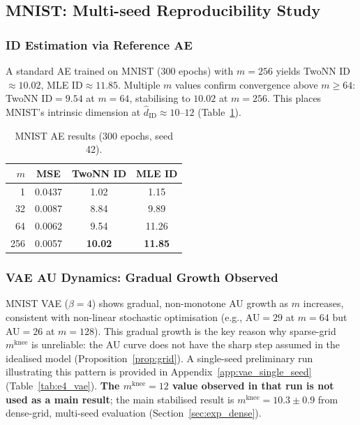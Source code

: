 \documentclass[11pt,a4paper]{article}
\newcommand{\mknee}{m^{\mathrm{knee}}}
\newcommand{\hatdID}{\hat{d}_{\mathrm{ID}}}
\begin{document}
\subsection{MNIST: Multi-seed Reproducibility Study}\label{sec:exp_mnist}

\subsubsection{ID Estimation via Reference AE}

A standard AE trained on MNIST (300 epochs) with $m=256$ yields
TwoNN ID$\approx10.02$, MLE ID$\approx11.85$.
Multiple $m$ values confirm convergence above $m\geq64$:
TwoNN ID$=9.54$ at $m=64$, stabilising to $10.02$ at $m=256$.
This places MNIST's intrinsic dimension at $\hatdID\approx10$--$12$
(Table~\ref{tab:e4_ae}).

\begin{table}[ht]
\centering
\caption{MNIST AE results (300 epochs, seed 42).}
\label{tab:e4_ae}
\small
\begin{tabular}{rccc}
\toprule
$m$ & MSE & TwoNN ID & MLE ID \\
\midrule
1   & 0.0437 & 1.02  & 1.15  \\
32  & 0.0087 & 8.84  & 9.89  \\
64  & 0.0062 & 9.54  & 11.26 \\
256 & 0.0057 & \textbf{10.02} & \textbf{11.85} \\
\bottomrule
\end{tabular}
\end{table}

\subsubsection{VAE AU Dynamics: Gradual Growth Observed}
\label{sec:vae_au_dynamics}

MNIST VAE ($\beta=4$) shows gradual, non-monotone AU growth as $m$ increases,
consistent with non-linear stochastic optimisation (e.g., AU$=29$ at $m=64$
but AU$=26$ at $m=128$).
This gradual growth is the key reason why sparse-grid $\mknee$ is unreliable:
the AU curve does not have the sharp step assumed in the idealised model
(Proposition~\ref{prop:grid}).
A single-seed preliminary run illustrating this pattern is provided in
Appendix~\ref{app:vae_single_seed} (Table~\ref{tab:e4_vae}).
\textbf{The $\mknee=12$ value observed in that run is not used as a main
result}; the main stabilised result is $\mknee=10.3\pm0.9$ from dense-grid,
multi-seed evaluation (Section~\ref{sec:exp_dense}).
\end{document}
